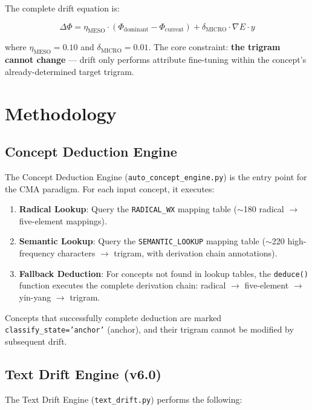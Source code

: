 \documentclass[11pt,a4paper]{article}
\begin{document}
The complete drift equation is:

\[
\Delta\Phi = \eta_{\text{MESO}} \cdot (\Phi_{\text{dominant}} - \Phi_{\text{current}}) + \delta_{\text{MICRO}} \cdot \nabla E \cdot y
\]

where $\eta_{\text{MESO}} = 0.10$ and $\delta_{\text{MICRO}} = 0.01$. The core constraint: \textbf{the trigram cannot change} — drift only performs attribute fine-tuning within the concept's already-determined target trigram.

\section{Methodology}

\subsection{Concept Deduction Engine}

The Concept Deduction Engine (\texttt{auto\_concept\_engine.py}) is the entry point for the CMA paradigm. For each input concept, it executes:

\begin{enumerate}
    \item \textbf{Radical Lookup}: Query the \texttt{RADICAL\_WX} mapping table ($\sim$180 radical $\rightarrow$ five-element mappings).
    \item \textbf{Semantic Lookup}: Query the \texttt{SEMANTIC\_LOOKUP} mapping table ($\sim$220 high-frequency characters $\rightarrow$ trigram, with derivation chain annotations).
    \item \textbf{Fallback Deduction}: For concepts not found in lookup tables, the \texttt{deduce()} function executes the complete derivation chain: radical $\rightarrow$ five-element $\rightarrow$ yin-yang $\rightarrow$ trigram.
\end{enumerate}

Concepts that successfully complete deduction are marked \texttt{classify\_state='anchor'} (anchor), and their trigram cannot be modified by subsequent drift.

\subsection{Text Drift Engine (v6.0)}

The Text Drift Engine (\texttt{text\_drift.py}) performs the following:
\end{document}
